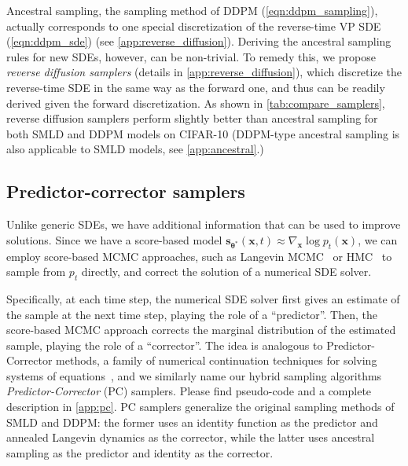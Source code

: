 \documentclass{article} \usepackage{iclr2021_conference,times}
\newcommand{\bfx}{\mathbf{x}}
\newcommand{\bftheta}{{\boldsymbol{\theta}}}
\newcommand{\bfs}{\mathbf{s}}
\begin{document}
Ancestral sampling, the sampling method of DDPM (\cref{eqn:ddpm_sampling}), actually corresponds to one special discretization of the reverse-time VP SDE (\cref{eqn:ddpm_sde}) (see \cref{app:reverse_diffusion}). Deriving the ancestral sampling rules for new SDEs, however, can be non-trivial. To remedy this, we propose \emph{reverse diffusion samplers} (details in \cref{app:reverse_diffusion}), which discretize the reverse-time SDE in the same way as the forward one, and thus can be readily derived given the forward discretization.
As shown in \cref{tab:compare_samplers}, reverse diffusion samplers perform slightly better than ancestral sampling for both SMLD and DDPM models on CIFAR-10 (DDPM-type ancestral sampling is also applicable to SMLD models, see \cref{app:ancestral}.)


\subsection{Predictor-corrector samplers}
Unlike generic SDEs, we have additional information that can be used to improve solutions. Since we have a score-based model $\bfs_{\bftheta^*}(\bfx, t) \approx \nabla_\bfx \log p_t(\bfx)$, we can employ score-based MCMC approaches, such as Langevin MCMC~\citep{parisi1981correlation,grenander1994representations} or HMC~\citep{neal2011mcmc} to sample from $p_t$ directly, and correct the solution of a numerical SDE solver. 

Specifically, at each time step, the numerical SDE solver first gives an estimate of the sample at the next time step, playing the role of a ``predictor''. Then, the score-based MCMC approach corrects the 
marginal distribution of the estimated sample, playing the role of a ``corrector''. The idea is analogous to Predictor-Corrector methods, a family of numerical continuation techniques for solving systems of equations~\citep{allgower2012numerical}, and we similarly name our hybrid sampling algorithms \emph{Predictor-Corrector} (PC) samplers. Please find pseudo-code and a complete description in \cref{app:pc}. PC samplers generalize the original sampling methods of SMLD and DDPM: the former uses an identity function as the predictor and annealed Langevin dynamics as the corrector, while the latter uses ancestral sampling as the predictor and identity as the corrector. 
\end{document}
